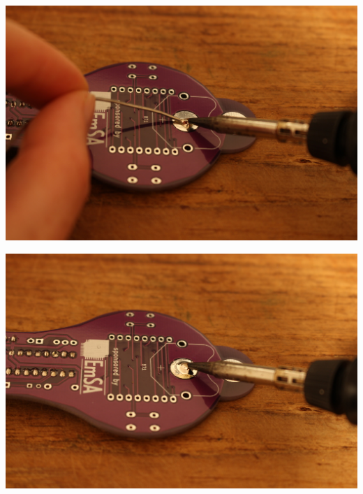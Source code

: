 \documentclass{article}
\begin{document}
\begin{minipage}[b]{0.5\textwidth}
	\includegraphics[width=\textwidth]{Bilder2024/IMG_0047.JPG}
\end{minipage}
\begin{minipage}[b]{0.5\textwidth}
	\includegraphics[width=\textwidth]{Bilder2024/IMG_0048.JPG}
\end{minipage}

\vspace{0.5cm}
\end{document}
